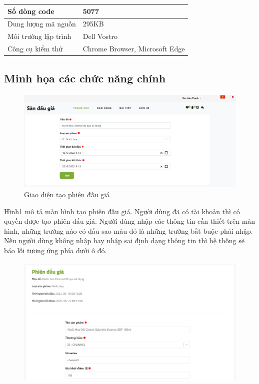 \documentclass[../DoAn.tex]{subfiles}
\begin{document}
    \tabletail{\hline}
    \label{bang412}
    \begin{supertabular}{| p{.45\textwidth}| p{.45\textwidth} |} 
    \hline
        Số dòng code& 5077\\\hline
        Dung lượng mã nguồn&295KB \\\hline
        Môi trường lập trình&Dell Vostro \\\hline
        Công cụ kiểm thử & Chrome Browser, Microsoft Edge\\\hline
    \end{supertabular}
\subsection{Minh họa các chức năng chính}
\begin{figure}[H]
    \centering
    \includegraphics[width=11.4cm,height=4.95cm]{Hinhve/createauctiondemo.png}
    \caption{Giao diện tạo phiên đấu giá}
    \label{fig:Fig414}
\end{figure}
Hình\ref{fig:Fig414} mô tả màn hình tạo phiên đấu giá. Người dùng đã có tài khoản thì có quyền được tạo phiên đấu giá. Người dùng nhập các thông tin cần thiết trên màn hình, những trường nào có dấu sao màu đỏ là những trường bắt buộc phải nhập. Nếu người dùng không nhập hay nhập sai định dạng thông tin thì hệ thống sẽ báo lỗi tương ứng phía dưới ô đó. 
\begin{figure}[H]
    \centering
    \includegraphics[width=11.4cm,height=6.28cm]{Hinhve/createitem1demo.png}
    \label{fig:Fig4151}
\end{figure}
\end{document}
